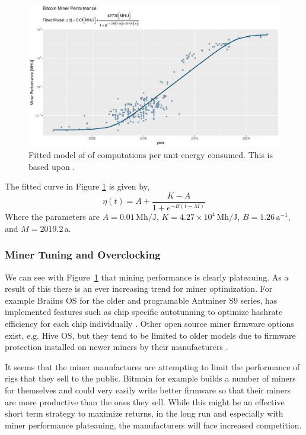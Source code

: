 \documentclass[runningheads]{llncs}
\begin{document}
\begin{figure}
    \includegraphics[width=\textwidth]{BTC Mining Performance.pdf}
    \caption{Fitted model of of computations per unit energy consumed. This is based upon \cite{kuf2019mining}.} \label{fig:3}
\end{figure}

The fitted curve in Figure \ref{fig:3} is given by,
\begin{equation}
    \eta(t) = A + \frac{K - A}{1 + e^{-B(t - M)}}
\end{equation}
Where the parameters are $A = 0.01 \,\textrm{Mh/J}$, $K = 4.27\times 10^4 \,\textrm{Mh/J}$,  $B = 1.26 \,\textrm{a}^{-1}$, and $ M = 2019.2 \,\textrm{a}$.


\subsubsection{Miner Tuning and Overclocking}
We can see with Figure~\ref{fig:3} that mining performance is clearly plateauing.
As a result of this there is an ever increasing trend for miner optimization.
For example Braiins OS for the older and programable Antminer S9 series, has implemented features such as chip specific autotunning to optimize hashrate efficiency for each chip individually \cite{braiins2021autotuning}.
Other open source miner firmware options exist, e.g. Hive OS, but they tend to be limited to older models due to firmware protection installed on newer miners by their manufacturers \cite{hiveos2020update}.

It seems that the miner manufactures are attempting to limit the performance of rigs that they sell to the public.
Bitmain for example builds a number of miners for themselves and could very easily write better firmware so that their miners are more productive than the ones they sell.
While this might be an effective short term strategy to maximize returns, in the long run and especially with miner performance plateauing, the manufacturers will face increased competition.
\end{document}

